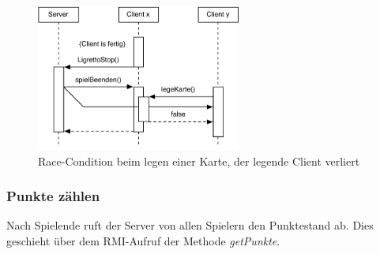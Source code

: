 \begin{figure}[H]
  \centering
  \includegraphics[width=0.60\textwidth,angle=0]{graphics/LigrettoStop_Kollision_B.pdf}
  \caption{Race-Condition beim legen einer Karte, der legende Client verliert\hfill{} }
  \label{LigrettoStop_Kollision_B}
\end{figure}

\subsubsection{Punkte zählen}
Nach Spielende ruft der Server von allen Spielern den Punktestand ab. Dies geschieht über dem RMI-Aufruf der Methode \textit{getPunkte}.



